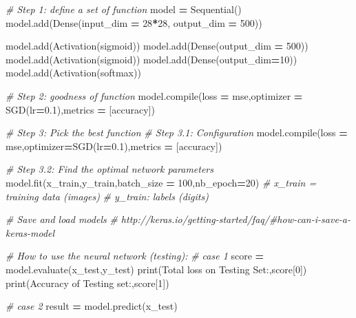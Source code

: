 \documentclass[
]{book}
\newenvironment{Shaded}{\begin{snugshade}}{\end{snugshade}}
\newcommand{\BuiltInTok}[1]{#1}
\newcommand{\CommentTok}[1]{\textcolor[rgb]{0.56,0.35,0.01}{\textit{#1}}}
\newcommand{\DecValTok}[1]{\textcolor[rgb]{0.00,0.00,0.81}{#1}}
\newcommand{\FloatTok}[1]{\textcolor[rgb]{0.00,0.00,0.81}{#1}}
\newcommand{\NormalTok}[1]{#1}
\newcommand{\OperatorTok}[1]{\textcolor[rgb]{0.81,0.36,0.00}{\textbf{#1}}}
\newcommand{\StringTok}[1]{\textcolor[rgb]{0.31,0.60,0.02}{#1}}
\begin{document}
\begin{Shaded}
\begin{Highlighting}[]
\CommentTok{\# Step 1: define a set of function  }
\NormalTok{model }\OperatorTok{=}\NormalTok{ Sequential()}
\NormalTok{model.add(Dense(input\_dim }\OperatorTok{=} \DecValTok{28}\OperatorTok{*}\DecValTok{28}\NormalTok{,}
\NormalTok{output\_dim }\OperatorTok{=} \DecValTok{500}\NormalTok{))}

\NormalTok{model.add(Activation(}\StringTok{\textquotesingle{}sigmoid\textquotesingle{}}\NormalTok{))}
\NormalTok{model.add(Dense(output\_dim }\OperatorTok{=} \DecValTok{500}\NormalTok{))}
\NormalTok{model.add(Activation(}\StringTok{\textquotesingle{}sigmoid\textquotesingle{}}\NormalTok{))}
\NormalTok{model.add(Dense(output\_dim}\OperatorTok{=}\DecValTok{10}\NormalTok{))}
\NormalTok{model.add(Activation(}\StringTok{\textquotesingle{}softmax\textquotesingle{}}\NormalTok{))}

\CommentTok{\# Step 2: goodness of function}
\NormalTok{model.}\BuiltInTok{compile}\NormalTok{(loss }\OperatorTok{=} \StringTok{\textquotesingle{}mse\textquotesingle{}}\NormalTok{,optimizer }\OperatorTok{=}\NormalTok{ SGD(lr}\OperatorTok{=}\FloatTok{0.1}\NormalTok{),metrics }\OperatorTok{=}\NormalTok{ [}\StringTok{\textquotesingle{}accuracy\textquotesingle{}}\NormalTok{])}

\CommentTok{\# Step 3: Pick the best function  }
\CommentTok{\# Step 3.1: Configuration}
\NormalTok{model.}\BuiltInTok{compile}\NormalTok{(loss }\OperatorTok{=} \StringTok{\textquotesingle{}mse\textquotesingle{}}\NormalTok{,optimizer}\OperatorTok{=}\NormalTok{SGD(lr}\OperatorTok{=}\FloatTok{0.1}\NormalTok{),metrics }\OperatorTok{=}\NormalTok{ [}\StringTok{\textquotesingle{}accuracy\textquotesingle{}}\NormalTok{])}

\CommentTok{\# Step 3.2: Find the optimal network parameters}
\NormalTok{model.fit(x\_train,y\_train,batch\_size }\OperatorTok{=} \DecValTok{100}\NormalTok{,nb\_epoch}\OperatorTok{=}\DecValTok{20}\NormalTok{) }\CommentTok{\# x\_train = training data (images)}
\CommentTok{\# y\_train: labels (digits) }


\CommentTok{\# Save and load models  }
\CommentTok{\# http://keras.io/getting{-}started/faq/\#how{-}can{-}i{-}save{-}a{-}keras{-}model}

\CommentTok{\# How to use the neural network (testing): }
\CommentTok{\# case 1 }
\NormalTok{score }\OperatorTok{=}\NormalTok{ model.evaluate(x\_test,y\_test)}
\BuiltInTok{print}\NormalTok{(}\StringTok{\textquotesingle{}Total loss on Testing Set:\textquotesingle{}}\NormalTok{,score[}\DecValTok{0}\NormalTok{])}
\BuiltInTok{print}\NormalTok{(}\StringTok{\textquotesingle{}Accuracy of Testing set:\textquotesingle{}}\NormalTok{,score[}\DecValTok{1}\NormalTok{])}

\CommentTok{\# case 2}
\NormalTok{result }\OperatorTok{=}\NormalTok{ model.predict(x\_test)}
\end{Highlighting}
\end{Shaded}
\end{document}
